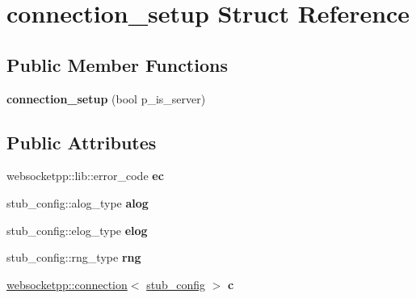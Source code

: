 \hypertarget{structconnection__setup}{}\section{connection\+\_\+setup Struct Reference}
\label{structconnection__setup}
\subsection*{Public Member Functions}
\begin{DoxyCompactItemize}
\item 
{\bfseries connection\+\_\+setup} (bool p\+\_\+is\+\_\+server)\hypertarget{structconnection__setup_a869b472c8f382978952f7464691bcdf6}{}\label{structconnection__setup_a869b472c8f382978952f7464691bcdf6}

\end{DoxyCompactItemize}
\subsection*{Public Attributes}
\begin{DoxyCompactItemize}
\item 
websocketpp\+::lib\+::error\+\_\+code {\bfseries ec}\hypertarget{structconnection__setup_a346ad11f02d53d19e43341421129bd9e}{}\label{structconnection__setup_a346ad11f02d53d19e43341421129bd9e}

\item 
stub\+\_\+config\+::alog\+\_\+type {\bfseries alog}\hypertarget{structconnection__setup_a6c38f74ec4808c75e3e94c4fa383009b}{}\label{structconnection__setup_a6c38f74ec4808c75e3e94c4fa383009b}

\item 
stub\+\_\+config\+::elog\+\_\+type {\bfseries elog}\hypertarget{structconnection__setup_a8405b9be773a039b02a82b65b7bd315e}{}\label{structconnection__setup_a8405b9be773a039b02a82b65b7bd315e}

\item 
stub\+\_\+config\+::rng\+\_\+type {\bfseries rng}\hypertarget{structconnection__setup_afa3788b834ae30107318cc3e1d188c6d}{}\label{structconnection__setup_afa3788b834ae30107318cc3e1d188c6d}

\item 
\hyperlink{classwebsocketpp_1_1connection}{websocketpp\+::connection}$<$ \hyperlink{structstub__config}{stub\+\_\+config} $>$ {\bfseries c}\hypertarget{structconnection__setup_a98b4b5701160021ac9151a7af145a940}{}\label{structconnection__setup_a98b4b5701160021ac9151a7af145a940}

\end{DoxyCompactItemize}


